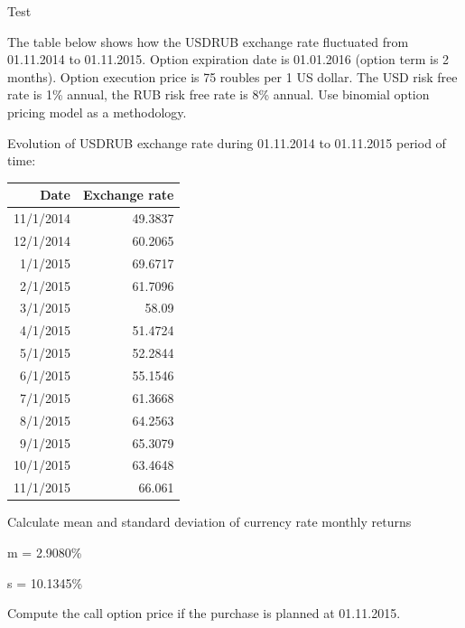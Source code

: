 \documentclass[12pt, table]{exam}
\begin{document}
\setcounter{section}{0\relax}%
\noindent
\normalsize

\begin{questions}
\question[40] Test
\answerstotestShort
	
\question[20] The table below shows how the USDRUB exchange rate fluctuated from 01.11.2014 to 01.11.2015. Option expiration date is 01.01.2016 (option term is 2 months). Option execution price is 75 roubles per 1 US dollar. The USD risk free rate is 1\% annual, the RUB risk free rate is 8\% annual. Use binomial option pricing model as a methodology. 

Evolution of USDRUB exchange rate during 01.11.2014 to 01.11.2015 period of time:
\begin{table}[htbp]
\centering
\begin{tabular}{rr}
	\toprule
	Date & Exchange rate \\ \midrule
	11/1/2014 &       49.3837 \\
	12/1/2014 &       60.2065 \\
	1/1/2015 &       69.6717 \\
	2/1/2015 &       61.7096 \\
	3/1/2015 &         58.09 \\
	4/1/2015 &       51.4724 \\
	5/1/2015 &       52.2844 \\
	6/1/2015 &       55.1546 \\
	7/1/2015 &       61.3668 \\
	8/1/2015 &       64.2563 \\
	9/1/2015 &       65.3079 \\
	10/1/2015 &       63.4648 \\
	11/1/2015 &        66.061
\end{tabular}%
\end{table}


\begin{subparts}
\subpart[5] Calculate mean and standard deviation of currency rate monthly returns
\begin{solution}[8em]
	
	m = 2.9080\%
	
	s = 10.1345\%	
\end{solution}

\subpart[10] Compute the call option price if the purchase is planned at 01.11.2015.
\begin{solution}[20em]
	

\end{solution}
\end{subparts}
\end{questions}
\end{document}
